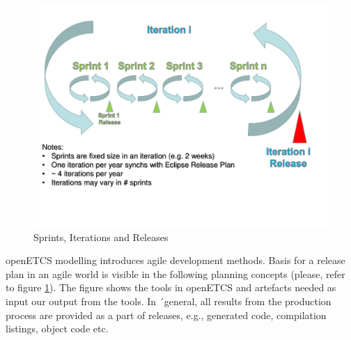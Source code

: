 \documentclass{template/openetcs_report}
\begin{document}
\begin{description}
\begin{figure}
\includegraphics[width=\textwidth]{figures/iterations.pdf}
\caption{Sprints, Iterations and Releases
\label{f:iteration}}
\end{figure}

openETCS modelling introduces agile development methods. Basis for a release plan in an agile world is visible in the following planning concepts (please, refer to figure \ref{f:iteration}). The figure shows the tools in openETCS and artefacts needed as input our output from the tools. In ´general, all results from the production process are provided as a part of releases, e.g., generated code, compilation listings, object code etc.


\end{description}
\end{document}
